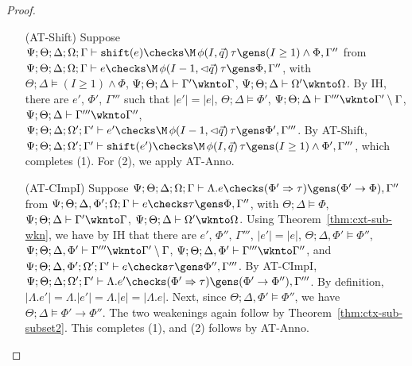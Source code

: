 \begin{proof}
\begin{itemize}
  \item[(AT-Shift)] Suppose $\Psi ; \Theta ; \Delta ; \Omega ; \Gamma \vdash \texttt{shift}(e) \checks \M \, \phi(I,\vec{q}) \, \tau \gens (I \geq 1) \wedge \Phi, \Gamma''$ from
  $\Psi ; \Theta ; \Delta  ; \Omega ; \Gamma \vdash e \checks \M \, \phi(I - 1,\lhd \vec{q}) \, \tau \gens \Phi, \Gamma''$, with
  $\Theta ; \Delta \vDash (I \geq 1) \wedge \Phi$,
  $\Psi ; \Theta ; \Delta \vdash \Gamma' \wknto \Gamma$,
  $\Psi ; \Theta ; \Delta \vdash \Omega' \wknto \Omega$.
  By IH, there are $e'$, $\Phi'$, $\Gamma'''$ such that
  $|e'| = |e|$,
  $\Theta ; \Delta \vDash \Phi'$,
  $\Psi ; \Theta ; \Delta \vdash \Gamma''' \wknto \Gamma' \setminus \Gamma$,
  $\Psi ; \Theta ; \Delta \vdash \Gamma''' \wknto \Gamma''$,
  $\Psi ; \Theta ; \Delta ; \Omega' ; \Gamma' \vdash e' \checks \M \, \phi(I-1,\lhd \vec{q}) \, \tau \gens \Phi', \Gamma'''$.
  By AT-Shift,
  $\Psi ; \Theta ; \Delta ; \Omega' ; \Gamma' \vdash \texttt{shift}(e') \checks \M \, \phi(I,\vec{q}) \, \tau \gens (I \geq 1) \wedge \Phi', \Gamma'''$,
  which completes (1). For (2), we apply AT-Anno.
  
  \item[(AT-CImpI)] Suppose $\Psi ; \Theta ; \Delta ; \Omega ; \Gamma \vdash \Lambda .e \checks (\Phi' \Rightarrow \tau) \gens (\Phi' \to \Phi),\Gamma''$ from
  $\Psi ; \Theta ; \Delta, \Phi'; \Omega ; \Gamma \vdash e \checks \tau \gens \Phi,\Gamma''$, with
  $\Theta ; \Delta \vDash \Phi$,
  $\Psi ; \Theta ; \Delta \vdash \Gamma' \wknto \Gamma$,
  $\Psi ; \Theta ; \Delta \vdash \Omega' \wknto \Omega$.
  Using Theorem~\ref{thm:cxt-sub-wkn}, we have by IH that there are $e'$, $\Phi''$, $\Gamma'''$,
  $|e'| = |e|$,
  $\Theta ; \Delta, \Phi' \vDash \Phi''$,
  $\Psi ; \Theta ; \Delta, \Phi' \vdash \Gamma''' \wknto \Gamma' \setminus \Gamma$,
  $\Psi ; \Theta ; \Delta, \Phi' \vdash \Gamma''' \wknto \Gamma''$, and
  $\Psi ; \Theta ; \Delta, \Phi' ; \Omega' ; \Gamma' \vdash e \checks \tau \gens \Phi'', \Gamma'''$.
  By AT-CImpI,
  $\Psi ; \Theta ; \Delta ; \Omega' ; \Gamma' \vdash \Lambda .e' \checks (\Phi' \Rightarrow \tau) \gens (\Phi' \to \Phi''),\Gamma'''$.
  By definition, $|\Lambda .e'| = \Lambda.|e'| = \Lambda.|e| = |\Lambda.e|$.
  Next, since $\Theta ; \Delta, \Phi' \vDash \Phi''$, we have $\Theta ; \Delta \vDash \Phi' \to \Phi''$.
  The two weakenings again follow by Theorem~\ref{thm:ctx-sub-subset2}.
  This completes (1), and (2) follows by AT-Anno.
  

\end{itemize}
\end{proof}
